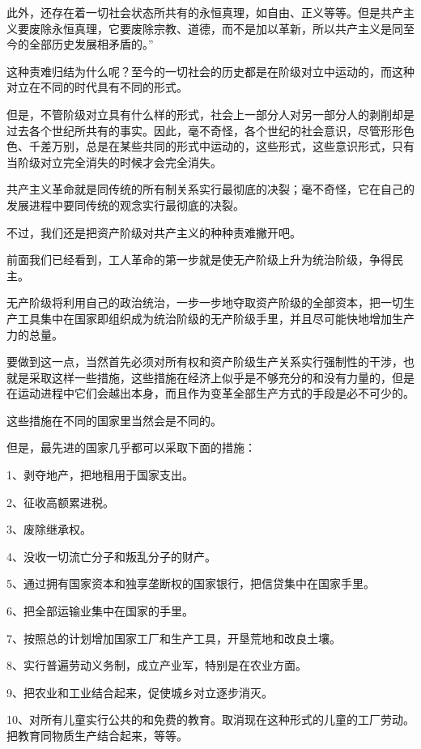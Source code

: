    此外，还存在着一切社会状态所共有的永恒真理，如自由、正义等等。但是共产主义要废除永恒真理，它要废除宗教、道德，而不是加以革新，所以共产主义是同至今的全部历史发展相矛盾的。”

    这种责难归结为什么呢？至今的一切社会的历史都是在阶级对立中运动的，而这种对立在不同的时代具有不同的形式。

    但是，不管阶级对立具有什么样的形式，社会上一部分人对另一部分人的剥削却是过去各个世纪所共有的事实。因此，毫不奇怪，各个世纪的社会意识，尽管形形色色、千差万别，总是在某些共同的形式中运动的，这些形式，这些意识形式，只有当阶级对立完全消失的时候才会完全消失。

    共产主义革命就是同传统的所有制关系实行最彻底的决裂；毫不奇怪，它在自己的发展进程中要同传统的观念实行最彻底的决裂。

    不过，我们还是把资产阶级对共产主义的种种责难撇开吧。

    前面我们已经看到，工人革命的第一步就是使无产阶级上升为统治阶级，争得民主。

    无产阶级将利用自己的政治统治，一步一步地夺取资产阶级的全部资本，把一切生产工具集中在国家即组织成为统治阶级的无产阶级手里，并且尽可能快地增加生产力的总量。

    要做到这一点，当然首先必须对所有权和资产阶级生产关系实行强制性的干涉，也就是采取这样一些措施，这些措施在经济上似乎是不够充分的和没有力量的，但是在运动进程中它们会越出本身，而且作为变革全部生产方式的手段是必不可少的。

    这些措施在不同的国家里当然会是不同的。

    但是，最先进的国家几乎都可以采取下面的措施：

    1、剥夺地产，把地租用于国家支出。

    2、征收高额累进税。

    3、废除继承权。

    4、没收一切流亡分子和叛乱分子的财产。

    5、通过拥有国家资本和独享垄断权的国家银行，把信贷集中在国家手里。

    6、把全部运输业集中在国家的手里。

    7、按照总的计划增加国家工厂和生产工具，开垦荒地和改良土壤。

    8、实行普遍劳动义务制，成立产业军，特别是在农业方面。

    9、把农业和工业结合起来，促使城乡对立逐步消灭。

    10、对所有儿童实行公共的和免费的教育。取消现在这种形式的儿童的工厂劳动。把教育同物质生产结合起来，等等。

